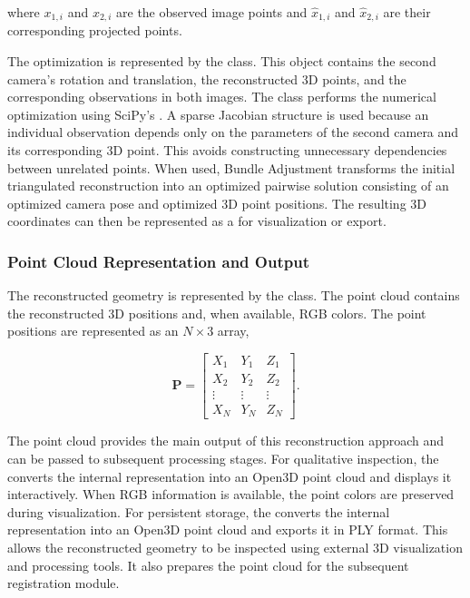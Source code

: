 where $x_{1,i}$ and $x_{2,i}$ are the observed image points and
$\hat{x}_{1,i}$ and $\hat{x}_{2,i}$ are their corresponding projected points.

The optimization is represented by the  class. This object
contains the second camera's rotation and translation, the reconstructed
3D points, and the corresponding observations in both images.
The  class performs the numerical optimization using
SciPy's . A sparse Jacobian structure is used because an
individual observation depends only on the parameters of the second camera
and its corresponding 3D point. This avoids constructing unnecessary
dependencies between unrelated points.
When used, Bundle Adjustment transforms the initial triangulated
reconstruction into an optimized pairwise solution consisting of an
optimized camera pose and optimized 3D point positions. The resulting
3D
coordinates can then be represented as a  for visualization
or export.

\subsubsection{Point Cloud Representation and Output}

The reconstructed geometry is represented by the  class.
The point cloud contains the reconstructed 3D positions and, when available,
RGB colors.
The point positions are represented as an $N \times 3$ array,

\begin{equation}
\mathbf{P} =
\begin{bmatrix}
X_1 & Y_1 & Z_1\\
X_2 & Y_2 & Z_2\\
\vdots & \vdots & \vdots\\
X_N & Y_N & Z_N
\end{bmatrix}.
\end{equation}

The point cloud provides the main output of this reconstruction approach and
can be passed to subsequent processing stages. For qualitative inspection, the  converts the internal
representation into an Open3D point cloud and displays it interactively.
When RGB information is available, the point colors are preserved during
visualization. For persistent storage, the  converts the internal
representation into an Open3D point cloud and exports it in PLY format. This
allows the reconstructed geometry to be inspected using external 3D
visualization and processing tools. It also prepares the point cloud for the subsequent registration module.


